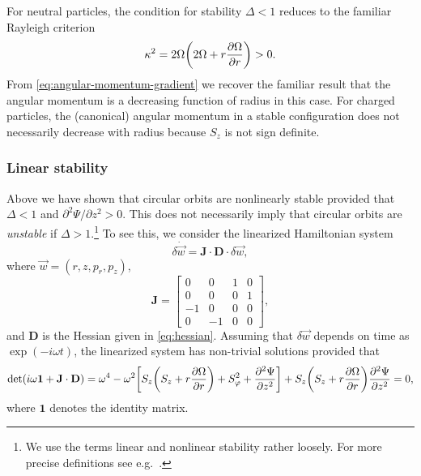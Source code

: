 \documentclass[aps,pre,notitlepage,amsmath,amssymb,amsfonts,nobibnotes,nofootinbib,superscriptaddress]{revtex4-1}
\begin{document}
For neutral particles, the condition for stability $\Delta<1$ reduces to the
familiar Rayleigh criterion
\begin{equation}
  \label{eq:global-rayleigh-criterion}
  \kappa^2 = 2\Omega\left(2\Omega + r\pder{\Omega}{r}\right) > 0.
\end{equation}
From \cref{eq:angular-momentum-gradient} we recover the familiar result
\citep[e.g.][]{Chandrasekhar1961} that the angular momentum is a decreasing
function of radius in this case. For charged particles, the (canonical)
angular momentum in a stable configuration does not necessarily decrease with
radius because $S_z$ is not sign definite.

\subsubsection{Linear stability}

Above we have shown that circular orbits are nonlinearly stable provided that
$\Delta<1$ and $\partial^2\Psi/\partial{}z^2>0$. This does not necessarily
imply that circular orbits are \emph{unstable} if $\Delta>1$.\footnote{We use
  the terms linear and nonlinear stability rather loosely. For more precise
  definitions see e.g.\ \citet{Holm1985}.} To see this, we consider the
linearized Hamiltonian system
\begin{equation}
  \delta\dot{\vec{w}} = \mathbf{J}\cdot\mathbf{D}\cdot\delta\vec{w},
\end{equation}
where $\vec{w}=(r,z,p_r,p_z)$,
\begin{equation}
  \mathbf{J} = \begin{bmatrix}
     0 &  0 & 1 & 0 \\
     0 &  0 & 0 & 1 \\
    -1 &  0 & 0 & 0 \\
     0 & -1 & 0 & 0
  \end{bmatrix},
\end{equation}
and $\mathbf{D}$ is the Hessian given in \cref{eq:hessian}. Assuming that
$\delta\vec{w}$ depends on time as $\exp(-i\omega{}t)$, the linearized system
has non-trivial solutions provided that
\begin{equation}
  \label{eq:solubility-condition}
  \det(i\omega\mathbf{1} + \mathbf{J}\cdot\mathbf{D}) =
  \omega^4 - \omega^2\left[
    S_z\left(S_z + r\pder{\Omega}{r}\right) + S_\varphi^2 + \pdder{\Psi}{z}
  \right]
  + S_z\left(S_z + r\pder{\Omega}{r}\right)\pdder{\Psi}{z} = 0,
\end{equation}
where $\mathbf{1}$ denotes the identity matrix.
\end{document}
